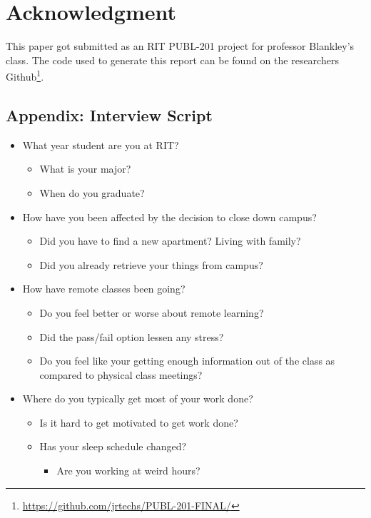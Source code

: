 \documentclass[12pt,
 reprint,
nofootinbib,
 amsmath,amssymb,
 aps,
floatfix,
]{revtex4-2}
\begin{document}
\section{Acknowledgment}

This paper got submitted as an RIT PUBL-201 project for professor Blankley's class.
The code used to generate this report can be found on the researchers Github\footnote{\url{https://github.com/jrtechs/PUBL-201-FINAL/}}.

\subsection{\label{appendix:interview}Appendix: Interview Script}


\begin{itemize}
    \item What year student are you at RIT?
    \begin{itemize}
        \item What is your major?
        \item When do you graduate?
    \end{itemize} 
    \item How have you been affected by the decision to close down campus?
    \begin{itemize}
        \item Did you have to find a new apartment? Living with family?
        \item Did you already retrieve your things from campus?
    \end{itemize}
    \item How have remote classes been going?
    \begin{itemize}
        \item Do you feel better or worse about remote learning?
        \item Did the pass/fail option lessen any stress?
        \item Do you feel like your getting enough information out of the class as compared to physical class meetings?
    \end{itemize}
    \item Where do you typically get most of your work done?
    \begin{itemize}
        \item Is it hard to get motivated to get work done?
        \item Has your sleep schedule changed?
            \begin{itemize}
                \item Are you working at weird hours?

\end{itemize}
\end{itemize}
\end{itemize}
\end{document}

